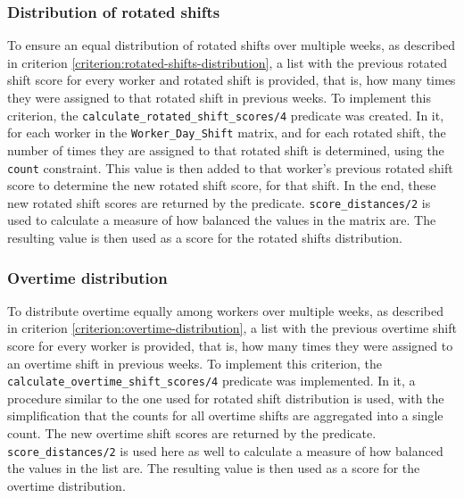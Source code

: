 \documentclass[conference]{IEEEtran}
\def\constraint#1{\vspace{4pt} {#1}}
\begin{document}
\constraint {
    \subsubsection*{Distribution of rotated shifts}
    To ensure an equal distribution of rotated shifts over multiple weeks, as described in criterion \ref{criterion:rotated-shifts-distribution}, a list with the previous rotated shift score for every worker and rotated shift is provided, that is, how many times they were assigned to that rotated shift in previous weeks. 
    To implement this criterion, the \texttt{calculate\_rotated\_shift\_scores/4} predicate was created. In it, for each worker in the \texttt{Worker\_Day\_Shift} matrix, and for each rotated shift, the number of times they are assigned to that rotated shift is determined, using the \texttt{count} constraint. This value is then added to that worker's previous rotated shift score to determine the new rotated shift score, for that shift. In the end, these new rotated shift scores are returned by the predicate. \texttt{score\_distances/2} is used to calculate a measure of how balanced the values in the matrix are. The resulting value is then used as a score for the rotated shifts distribution.
}


\constraint {
    \subsubsection*{Overtime distribution}
    To distribute overtime equally among workers over multiple weeks, as described in criterion \ref{criterion:overtime-distribution}, a list with the previous overtime shift score for every worker is provided, that is, how many times they were assigned to an overtime shift in previous weeks. 
    To implement this criterion, the \texttt{calculate\_overtime\_shift\_scores/4} predicate was implemented. In it, a procedure similar to the one used for rotated shift distribution is used, with the simplification that the counts for all overtime shifts are aggregated into a single count. The new overtime shift scores are returned by the predicate. \texttt{score\_distances/2} is used here as well to calculate a measure of how balanced the values in the list are. The resulting value is then used as a score for the overtime distribution.
}
\end{document}
